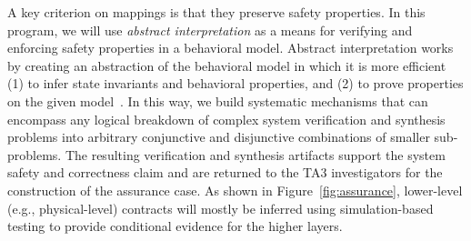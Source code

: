 A key criterion on mappings is that they preserve safety properties. 
In this program, we will use \emph{abstract interpretation} as a means for verifying and enforcing safety properties in a 
behavioral model. Abstract interpretation works by creating an 
abstraction of the behavioral model in which it is more efficient (1)
to infer state invariants and behavioral properties, and (2) to prove properties on the given model~\cite{Cousot77,Passerone2007}. In this way, we build systematic mechanisms that can encompass any logical breakdown of complex system verification and synthesis problems into arbitrary conjunctive and disjunctive combinations of smaller sub-problems. 
% 
The resulting verification and synthesis artifacts support the system safety and correctness claim and are returned to the TA3 investigators for the construction of the assurance case. As shown in Figure~\ref{fig:assurance},  lower-level (e.g., physical-level) contracts will mostly be inferred using simulation-based testing to provide conditional evidence for the higher layers. 
